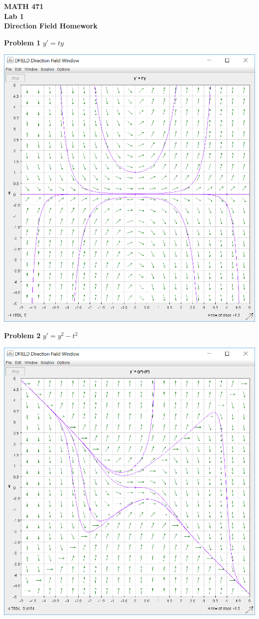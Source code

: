 \documentclass[10pt]{article}
\begin{document}
    \begin{center}{\bf\large MATH 471\\Lab 1\\Direction Field Homework}\end{center}
        {\bf Problem 1} $y'=ty$
            \begin{center}\includegraphics[scale=0.5]{lab1p3p1.PNG}\end{center}
        {\bf Problem 2} $y'=y^2-t^2$
            \begin{center}\includegraphics[scale=0.5]{lab1p3p2.PNG}\end{center}
\end{document}
